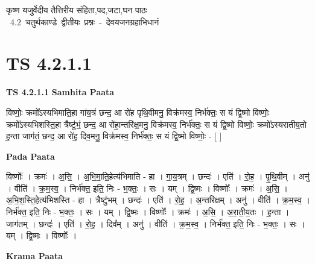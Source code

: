 \documentclass[17pt]{extarticle}
\begin{document}
\begin{titlepage}
    \begin{center}
 
\begin{sanskrit}
    { \Large
    कृष्ण यजुर्वेदीय तैत्तिरीय संहिता,पद,जटा,घन पाठः 
    }
    \\
    \vspace{2.5cm}
    \mbox{ \Large
    4.2      चतुर्थकाण्डे द्वीतीयः प्रश्नः - देवयजनग्रहाभिधानं   }
\end{sanskrit}
\end{center}

\end{titlepage}
\tableofcontents
{}
\pagebreak


\section{ TS 4.2.1.1 }

\textbf{TS 4.2.1.1 } \newline
\textbf{Samhita Paata} \newline

विष्णोः॒ क्रमो᳚ऽस्यभिमाति॒हा गा॑य॒त्रं छन्द॒ आ रो॑ह पृथि॒वीमनु॒ विक्र॑मस्व॒ निर्भ॑क्तः॒ स यं द्वि॒ष्मो विष्णोः॒ क्रमो᳚ऽस्यभिशस्ति॒हा त्रैष्टु॑भं॒ छन्द॒ आ रो॑हा॒न्तरि॑क्ष॒मनु॒ विक्र॑मस्व॒ निर्भ॑क्तः॒ स यं द्वि॒ष्मो विष्णोः॒ क्रमो᳚ऽस्यरातीय॒तो ह॒न्ता जाग॑तं॒ छन्द॒ आ रो॑ह॒ दिव॒मनु॒ विक्र॑मस्व॒ निर्भ॑क्तः॒ स यं द्वि॒ष्मो विष्णोः॒ - [  ] \newline

\textbf{Pada Paata} \newline

विष्णोः᳚ । क्रमः॑ । अ॒सि॒ । अ॒भि॒मा॒ति॒हेत्य॑भिमाति - हा । गा॒य॒त्रम् । छन्दः॑ । एति॑ । रो॒ह॒ । पृ॒थि॒वीम् । अनु॑ । वीति॑ । क्र॒म॒स्व॒ । निर्भ॑क्त॒ इति॒ निः - भ॒क्तः॒ । सः । यम् । द्वि॒ष्मः । विष्णोः᳚ । क्रमः॑ । अ॒सि॒ । अ॒भि॒श॒स्ति॒हेत्य॑भिशस्ति - हा । त्रैष्टु॑भम् । छन्दः॑ । एति॑ । रो॒ह॒ । अ॒न्तरि॑क्षम् । अनु॑ । वीति॑ । क्र॒म॒स्व॒ । निर्भ॑क्त॒ इति॒ निः - भ॒क्तः॒ । सः । यम् । द्वि॒ष्मः । विष्णोः᳚ । क्रमः॑ । अ॒सि॒ । अ॒रा॒ती॒य॒तः । ह॒न्ता । जाग॑तम् । छन्दः॑ । एति॑ । रो॒ह॒ । दिव᳚म् । अनु॑ । वीति॑ । क्र॒म॒स्व॒ । निर्भ॑क्त॒ इति॒ निः - भ॒क्तः॒ । सः । यम् । द्वि॒ष्मः । विष्णोः᳚ ।  \newline


\textbf{Krama Paata} \newline
\end{document}
